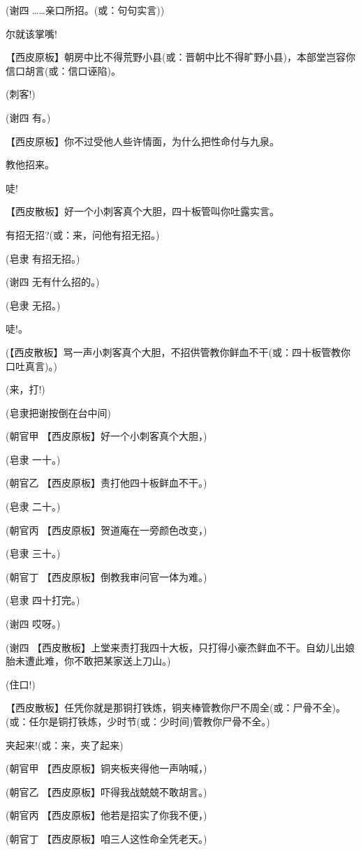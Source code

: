 (谢四 \ldots{}\ldots{}亲口所招。(或：句句实言))

尔就该掌嘴!

【西皮原板】朝房中比不得荒野小县(或：晋朝中比不得旷野小县)，本部堂岂容你信口胡言(或：信口诬陷)。

(刺客!)

(谢四 有。)

【西皮原板】你不过受他人些许情面，为什么把性命付与九泉。

教他招来。

唗!

【西皮散板】好一个小刺客真个大胆，四十板管叫你吐露实言。

有招无招?(或：来，问他有招无招。)

(皂隶 有招无招。)

(谢四 无有什么招的。)

(皂隶 无招。)

唗!。

(【西皮散板】骂一声小刺客真个大胆，不招供管教你鲜血不干(或：四十板管教你口吐真言)。)

(来，打!)

(皂隶把谢按倒在台中间)

(朝官甲 【西皮原板】好一个小刺客真个大胆，)

(皂隶 一十。)

(朝官乙 【西皮原板】责打他四十板鲜血不干。)

(皂隶 二十。)

(朝官丙 【西皮原板】贺道庵在一旁颜色改变，)

(皂隶 三十。)

(朝官丁 【西皮原板】倒教我审问官一体为难。)

(皂隶 四十打完。)

(谢四 哎呀。)

(谢四
【西皮散板】上堂来责打我四十大板，只打得小豪杰鲜血不干。自幼儿出娘胎未遭此难，你不敢把某家送上刀山。)

(住口!)

【西皮散板】任凭你就是那铜打铁炼，铜夹棒管教你尸不周全(或：尸骨不全)。(或：任尔是铜打铁炼，少时节(或：少时间)管教你尸骨不全。)

夹起来!(或：来，夹了起来)

(朝官甲 【西皮原板】铜夹板夹得他一声呐喊，)

(朝官乙 【西皮原板】吓得我战兢兢不敢胡言。)

(朝官丙 【西皮原板】他若是招实了你我不便，)

(朝官丁 【西皮原板】咱三人这性命全凭老天。)

